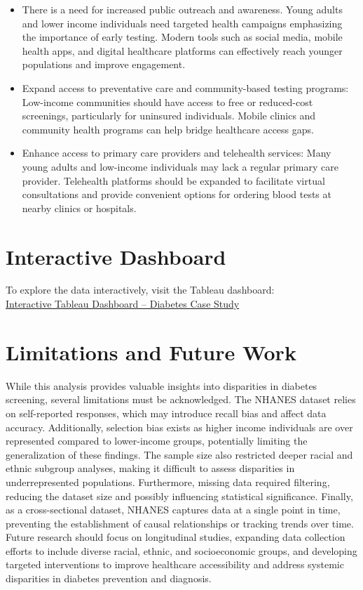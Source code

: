 \documentclass[
]{article}
\begin{document}
\begin{itemize}
\item
  There is a need for increased public outreach and awareness. Young
  adults and lower income individuals need targeted health campaigns
  emphasizing the importance of early testing. Modern tools such as
  social media, mobile health apps, and digital healthcare platforms can
  effectively reach younger populations and improve engagement.
\item
  Expand access to preventative care and community-based testing
  programs: Low-income communities should have access to free or
  reduced-cost screenings, particularly for uninsured individuals.
  Mobile clinics and community health programs can help bridge
  healthcare access gaps.
\item
  Enhance access to primary care providers and telehealth services: Many
  young adults and low-income individuals may lack a regular primary
  care provider. Telehealth platforms should be expanded to facilitate
  virtual consultations and provide convenient options for ordering
  blood tests at nearby clinics or hospitals.
\end{itemize}

\section{Interactive Dashboard}\label{interactive-dashboard}

To explore the data interactively, visit the Tableau dashboard:\\
\href{https://public.tableau.com/app/profile/jesus.torres.carbajal/viz/Diabetes_Case_Study/AgeDistributionofDiabetesDiagnoses?publish=yes}{Interactive
Tableau Dashboard -- Diabetes Case Study}

\section{Limitations and Future Work}\label{limitations-and-future-work}

While this analysis provides valuable insights into disparities in
diabetes screening, several limitations must be acknowledged. The NHANES
dataset relies on self-reported responses, which may introduce recall
bias and affect data accuracy. Additionally, selection bias exists as
higher income individuals are over represented compared to lower-income
groups, potentially limiting the generalization of these findings. The
sample size also restricted deeper racial and ethnic subgroup analyses,
making it difficult to assess disparities in underrepresented
populations. Furthermore, missing data required filtering, reducing the
dataset size and possibly influencing statistical significance. Finally,
as a cross-sectional dataset, NHANES captures data at a single point in
time, preventing the establishment of causal relationships or tracking
trends over time. Future research should focus on longitudinal studies,
expanding data collection efforts to include diverse racial, ethnic, and
socioeconomic groups, and developing targeted interventions to improve
healthcare accessibility and address systemic disparities in diabetes
prevention and diagnosis.
\end{document}
